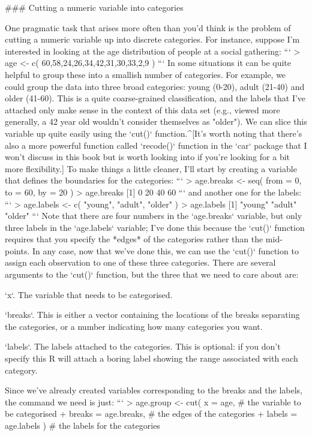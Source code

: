 ### Cutting a numeric variable into categories

One pragmatic task that arises more often than you'd think is the problem of cutting a numeric variable up into discrete categories. For instance, suppose I'm interested in looking at the age distribution of people at a social gathering:
```
> age <- c( 60,58,24,26,34,42,31,30,33,2,9 )
```
In some situations it can be quite helpful to group these into a smallish number of categories. For example, we could group the data into three broad categories: young (0-20), adult (21-40) and older (41-60). This is a quite coarse-grained classification, and the labels that I've attached only make sense in the context of this data set (e.g., viewed more generally, a 42 year old wouldn't consider themselves as "older"). We can slice this variable up quite easily using the `cut()` function.^[It's worth noting that there's also a more powerful function called `recode()` function in the `car` package that I won't discuss in this book but is worth looking into if you're looking for a bit more flexibility.] To make things a little cleaner, I'll start by creating a variable that defines the boundaries for the categories:
```
> age.breaks <- seq( from = 0, to = 60, by = 20 )
> age.breaks 
[1]  0 20 40 60
```
and another one for the labels:
```
> age.labels <- c( "young", "adult", "older" )
> age.labels
[1] "young" "adult" "older"
```
Note that there are four numbers in the `age.breaks` variable, but only three labels in the `age.labels` variable; I've done this because the `cut()` function requires that you specify the *edges* of the categories rather than the mid-points. In any case, now that we've done this, we can use the `cut()` function to assign each observation to one of these three categories. There are several arguments to the `cut()` function, but the three that we need to care about are:
 \itemsep 0pt
\item `x`. The variable that needs to be categorised. 
\item `breaks`. This is either a vector containing the locations of the breaks separating the categories, or a number indicating how many categories you want.
\item `labels`. The labels attached to the categories. This is optional: if you don't specify this R will attach a boring label showing the range associated with each category.

Since we've already created variables corresponding to the breaks and the labels, the command we need is just:
```
> age.group <- cut( x = age,               # the variable to be categorised
+                   breaks = age.breaks,   # the edges of the categories
+                   labels = age.labels )  # the labels for the categories

